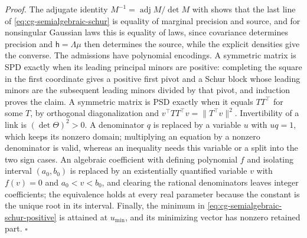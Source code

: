 \noindent\emph{Proof.}
The adjugate identity \(M^{-1}=\operatorname{adj}M/\det M\) with
 shows that the last line of
\eqref{eq:cg-semialgebraic-schur} is equality of marginal precision and source,
and for nonsingular Gaussian laws this is equality of laws, since covariance
determines precision and \(\mathsf h=\Lambda\mu\) then determines the source,
while the explicit densities give the converse. The admissions have polynomial
encodings. A symmetric matrix is SPD exactly when its leading principal minors
are positive: completing the square in the first coordinate gives a positive
first pivot and a Schur block whose leading minors are the subsequent leading
minors divided by that pivot, and induction proves the claim. A symmetric
matrix is PSD exactly when it equals \(TT^\top\) for some \(T\), by orthogonal
diagonalization and \(v^\top TT^\top v=\|T^\top v\|^2\). Invertibility of a link
is \((\det\Theta)^2>0\). A denominator \(q\) is replaced by a variable \(u\) with
\(uq=1\), which keeps its nonzero domain; multiplying an equation by a nonzero
denominator is valid, whereas an inequality needs this variable or a split into
the two sign cases. An algebraic coefficient with defining polynomial \(f\) and
isolating interval \((a_0,b_0)\) is replaced by an existentially quantified
variable \(v\) with \(f(v)=0\) and \(a_0<v<b_0\), and clearing the rational
denominators leaves integer coefficients; the equivalence holds at every real
parameter because the constant is the unique root in its interval. Finally, the
minimum in \eqref{eq:cg-semialgebraic-schur-positive} is attained at
\(u_{\min}\), and its minimizing vector has nonzero retained part.
\(\square\)

